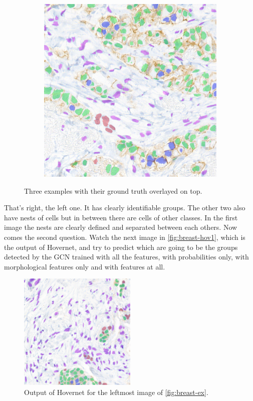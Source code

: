 \begin{figure}[H]
\begin{subfigure}[b]{0.3\textwidth}
  \end{subfigure}
  \begin{subfigure}[b]{0.3\textwidth}
    \includegraphics[width=\textwidth]{imgs/qual/breast/gt3.overlay.png}
  \end{subfigure}
    \caption{Three examples with their ground truth overlayed on top.}
    \label{fig:breast-ex}
\end{figure}

That's right, the left one. It has clearly identifiable groups. The other two also have nests of cells but in between there are cells of other classes. In the first image the nests are clearly defined and separated between each others. Now comes the second question. Watch the next image in \autoref{fig:breast-hov1}, which is the output of Hovernet, and try to predict which are going to be the groups detected by the GCN trained with all the features, with probabilities only, with morphological features only and with features at all.

\begin{figure}[H]
    \centering
    \includegraphics[width=0.5\textwidth]{imgs/qual/breast/hov1.png}
    \caption{Output of Hovernet for the leftmost image of \autoref{fig:breast-ex}.}
    \label{fig:breast-hov1}
\end{figure}

